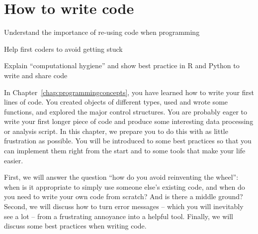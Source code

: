 \chapter{How to write code}
\label{chap:worldcode}

\begin{abstract}{Abstract}
Programming is no longer a solitary activity, and almost all questions, problems, and error messages have been encountered and solved before. This chapter explains the most common forms of collaboration and sources of outside help, as well as outlining best practice on how to write and share code yourself.
\end{abstract}


\begin{objectives}
\item Understand the importance of re-using code when programming
\item Help first coders to avoid getting stuck
\item Explain ``computational hygiene'' and show best practice in R and Python to write and share code
\end{objectives}

In Chapter~\ref{chap:programmingconcepts}, you have learned how to write
your first lines of code.  You created objects of different types,
used and wrote some functions, and explored the major control structures.
You are probably eager to write your first longer piece of code and
produce some interesting data processing or analysis script. In this
chapter, we prepare you to do this with as little frustration as possible.
You will be introduced to some best practices so that you can implement
them right from the start and to some tools that make your life easier.

First, we will answer the question ``how do you avoid reinventing
the wheel'': when is it appropriate to simply use someone else's existing code, and
when do you need to write your own code from scratch? And is there a middle ground?
Second, we will discuss how to turn error messages -- which you will inevitably
see a lot -- from a frustrating annoyance into a helpful tool.
Finally, we will discuss some best practices when writing code.

